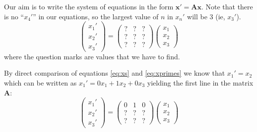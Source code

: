 Our aim is to write the system of equations in the form $\bm{x'} = \bm{A}\bm{x}$. Note that there is no ``$x_4'$'' in our equations, so the largest value of $n$ in $x_n'$ will be 3 (ie, $x_3'$).
\begin{equation}
    \left(
        \begin{array}{c}
            x_1' \\
            x_2' \\
            x_3'
        \end{array}
    \right)
    =
    \left(
        \begin{array}{ccc}
            ? & ? & ? \\
            ? & ? & ? \\
            ? & ? & ?
        \end{array}
    \right)
    \left(
        \begin{array}{c}
            x_1 \\
            x_2 \\
            x_3
        \end{array}
    \right)
\end{equation}
where the question marks are values that we have to find.

By direct comparison of equations \ref{eq:xs} and \ref{eq:xprimes} we know that $x_1' = x_2$ which can be written as $x_1' = 0 x_1 + 1 x_2 + 0 x_3$ yielding the first line in the matrix $\bm{A}$:
\begin{equation}
    \left(
        \begin{array}{c}
            x_1' \\
            x_2' \\
            x_3'
        \end{array}
    \right)
    =
    \left(
        \begin{array}{ccc}
            0 & 1 & 0 \\
            ? & ? & ? \\
            ? & ? & ?
        \end{array}
    \right)
    \left(
        \begin{array}{c}
            x_1 \\
            x_2 \\
            x_3
        \end{array}
    \right)
\end{equation}

